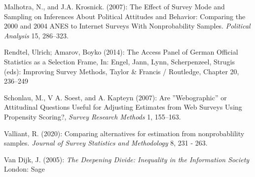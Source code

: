 \documentclass[a4paper , 11pt]{article}
\begin{document}
\begin{description}
\item Malhotra, N., and J.A. Krosnick. (2007): The Effect of Survey Mode and Sampling on Inferences About
Political Attitudes and Behavior: Comparing the 2000 and 2004 ANES to Internet Surveys With
Nonprobability Samples. \textit{Political Analysis} 15, 286–323.

 \item  Rendtel, Ulrich; Amarov, Boyko (2014): The Access Panel of German Official Statistics as a Selection Frame, In: Engel, Jann, Lynn, Scherpenzeel, Strugis (eds): Improving Survey Methods, Taylor \& Francis / Routledge, Chapter 20, 236--249
     
\item     Schonlau, M., V A. Soest, and A. Kapteyn (2007): Are ''Webographic'' or Attitudinal Questions
Useful for Adjusting Estimates from Web Surveys Using Propensity Scoring?, \textit{ Survey
Research Methods} 1, 155–163.
     
 \item Valliant, R. (2020): Comparing alternatives for estimation from nonprobablility samples. \textit{Journal of Survey Statistics and Methodology} 8, 231 - 263.
     
\item     Van Dijk, J. (2005): \textsl{The Deepening Divide: Inequality in the Information Society} London: Sage


\end{description}


 
\end{document}

